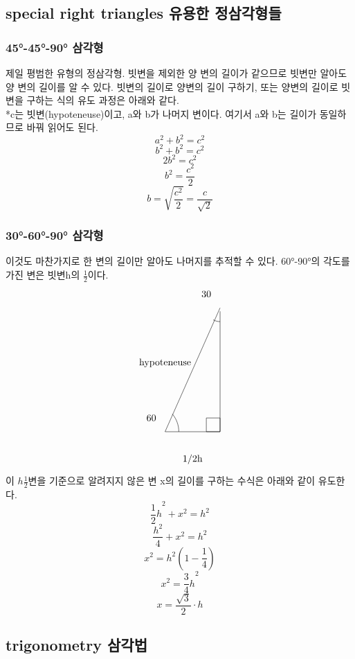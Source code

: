 \documentclass{article}
\begin{document}
\subsection{special right triangles 유용한 정삼각형들}
\subsubsection{\ang{45}-\ang{45}-\ang{90} 삼각형}
제일 평범한 유형의 정삼각형. 빗변을 제외한 양 변의 길이가 같으므로 빗변만 알아도 양 변의 길이를 알 수 있다. 빗변의 길이로 양변의 길이 구하기, 또는 양변의 길이로 빗변을 구하는 식의 유도 과정은 아래와 같다.\\
*c는 빗변(hypoteneuse)이고, a와 b가 나머지 변이다. 여기서 a와 b는 길이가 동일하므로 바꿔 읽어도 된다.
$$a^{2}+b^{2}=c^{2}$$
$$b^{2}+b^{2}=c^{2}$$
$$2b^{2}=c^{2}$$
$$b^{2}=\frac{c^{2}}{2}$$
$$b=\sqrt{\frac{c^{2}}{2}}=\frac{c}{\sqrt{2}}$$
\subsubsection{\ang{30}-\ang{60}-\ang{90} 삼각형}
이것도 마찬가지로 한 변의 길이만 알아도 나머지를 추적할 수 있다. \ang{60}-\ang{90}의 각도를 가진 변은 빗변h의 $\frac{1}{2}$이다.
$$
\begin{tikzpicture}

\draw (2,3) node (v1) {} -- (0,-1.5) -- (2,-1.5) -- (v1);
\draw (0.5,-1.5) arc (0:40:1);


\draw (2,2.5) arc (-89.999:-120:0.5);
\draw  (2,-1) rectangle (1.5,-1.5);
\node at (-0.5,-1) {60};
\node at (1.5,3.5) {30};
\node at (0,1) {hypoteneuse};
\node at (1,-2.5) {1/2h};
\end{tikzpicture}
$$
이 $h\frac{1}{2}$변을 기준으로 알려지지 않은 변 x의 길이를 구하는 수식은 아래와 같이 유도한다.
$${\frac{1}{2}h}^{2}+x^{2}=h^{2}$$
$$\frac{h^{2}}{4}+x^{2}=h^{2}$$
$$x^{2}=h^{2}(1-\frac{1}{4})$$
$$x^{2}={\frac{3}{4}h}^{2}$$
$$x={\frac{\sqrt{3}}{2}}{\cdot}h$$
\subsection{trigonometry 삼각법}
\end{document}
